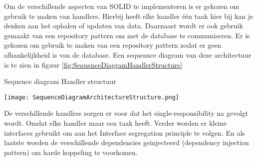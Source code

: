 \whitespace
Om de verschillende aspecten van SOLID te implementeren is er gekozen om gebruik te maken van handlers.
Hierbij heeft elke handler één taak hier bij kan je denken aan het ophalen of updaten van data.
Daarnaast wordt er ook gebruik gemaakt van een repository pattern om met de database te communiseren.
Er is gekozen om gebruik te maken van een repository pattern zodat er geen afhankelijkheid is van de database.
Een sequesnce diagram van deze architectuur is te zien in figuur \ref{fig:SequenceDiagramHandlerStructure}


\begin{graphic}
    \captionsetup{type=figure}
    \caption{Sequence diagram Handler structuur}
    \texttt{[image: SequenceDiagramArchitectureStructure.png]}
    \label{fig:SequenceDiagramHandlerStructure}
\end{graphic}

\whitespace
De verschillende handlres zorgen er voor dat het single-responsibility na gevolgt wordt.
Omdat elke handler maar een taak heeft.
Verder worden er kleine interfaces gebruikt om aan het Interface segregation principle te volgen.
En als laatste worden de verschillende dependencies geinjecteerd (dependency injection pattern) om harde koppeling te voorkomen.


